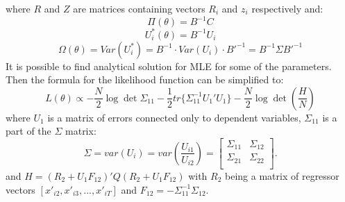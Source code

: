 \documentclass[a4paper]{article}
\begin{document}
where $R$ and $Z$ are matrices containing vectors $R_i$ and $z_i$ respectively and:
\begin{equation}\label{eq14}
    \Pi(\theta) = B^{-1} C
\end{equation}
\begin{equation}\label{eq15}
    U^*_i(\theta) = B^{-1} U_i
\end{equation}
\begin{equation}\label{eq16}
    \Omega(\theta) = Var(U^*_i) = B^{-1} \cdot Var(U_i) \cdot  B'^{-1} = B^{-1} \Sigma B'^{-1}
\end{equation}
It is possible to find analytical solution for MLE for some of the parameters. Then the formula for the likelihood function can be simplified to:
\begin{equation}\label{eq17}
    L(\theta) \propto - \frac{N}{2} \log \det \Sigma_{11} - \frac{1}{2} tr \{ \Sigma_{11}^{-1} U_1' U_1 \} - \frac{N}{2} \log \det (\frac{H}{N})
\end{equation}
\normalsize
\noindent where $U_1$ is a matrix of errors connected only to dependent variables, $\Sigma_{11}$ is a part of the $\Sigma$ matrix:
\begin{equation}\label{eq18}
\Sigma=var(U_{i})=var\left(\frac{U_{i1}}{U_{i2}}\right)=\begin{bmatrix}
            \Sigma_{11}&\Sigma_{12}\\
            \Sigma_{21}&\Sigma_{22}\\
            \end{bmatrix}.
\end{equation}
\noindent and $H = (R_2 + U_1 F_{12})' Q (R_2 + U_1 F_{12})$ with $R_2$ being a matrix of regressor vectors $[x'_{i2}, x'_{i3}, ..., x'_{iT}]$ and $F_{12} = - \Sigma_{11}^{-1} \Sigma_{12}$.
\end{document}
